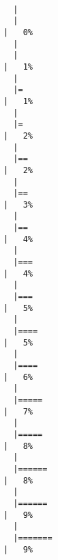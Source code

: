 \documentclass[
  letterpaper,
]{book}
\begin{document}
\begin{verbatim}

  |                                                                            
  |                                                                      |   0%
  |                                                                            
  |                                                                      |   1%
  |                                                                            
  |=                                                                     |   1%
  |                                                                            
  |=                                                                     |   2%
  |                                                                            
  |==                                                                    |   2%
  |                                                                            
  |==                                                                    |   3%
  |                                                                            
  |==                                                                    |   4%
  |                                                                            
  |===                                                                   |   4%
  |                                                                            
  |===                                                                   |   5%
  |                                                                            
  |====                                                                  |   5%
  |                                                                            
  |====                                                                  |   6%
  |                                                                            
  |=====                                                                 |   7%
  |                                                                            
  |=====                                                                 |   8%
  |                                                                            
  |======                                                                |   8%
  |                                                                            
  |======                                                                |   9%
  |                                                                            
  |=======                                                               |   9%

\end{verbatim}
\end{document}
